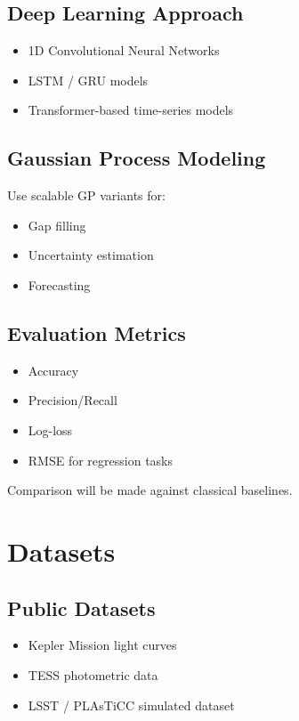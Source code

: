 \documentclass[12pt]{article}
\begin{document}
\subsection{Deep Learning Approach}
\begin{itemize}
    \item 1D Convolutional Neural Networks
    \item LSTM / GRU models
    \item Transformer-based time-series models
\end{itemize}

\subsection{Gaussian Process Modeling}
Use scalable GP variants for:
\begin{itemize}
    \item Gap filling
    \item Uncertainty estimation
    \item Forecasting
\end{itemize}

\subsection{Evaluation Metrics}
\begin{itemize}
    \item Accuracy
    \item Precision/Recall
    \item Log-loss
    \item RMSE for regression tasks
\end{itemize}

Comparison will be made against classical baselines.

\section{Datasets}

\subsection{Public Datasets}

\begin{itemize}
    \item Kepler Mission light curves
    \item TESS photometric data
    \item LSST / PLAsTiCC simulated dataset
\end{itemize}
\end{document}
